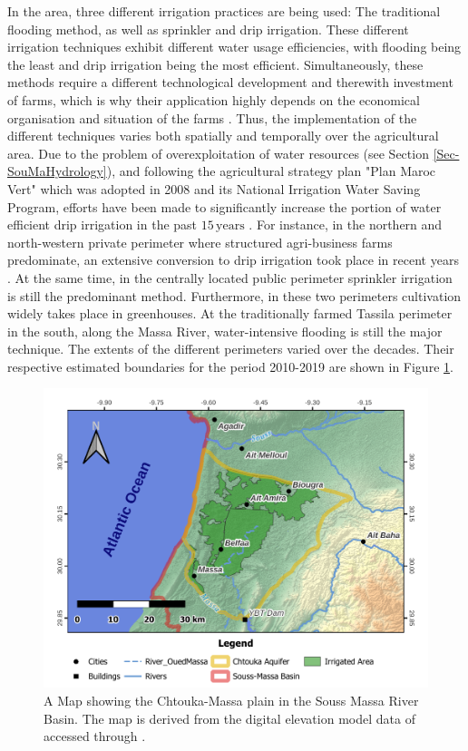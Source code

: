 In the area, three different irrigation practices are being used: The traditional flooding method, as well as sprinkler and drip irrigation. 
These different irrigation techniques exhibit different water usage efficiencies, with flooding being the least and drip irrigation being the most efficient. 
Simultaneously, these methods require a different technological development and therewith investment of farms, which is why their application highly depends on the economical organisation and situation of the farms \parencite{Choukr.2017}. 
Thus, the implementation of the different techniques varies both spatially and temporally over the agricultural area. 
Due to the problem of overexploitation of water resources (see Section \ref{Sec-SouMaHydrology}), and following the agricultural strategy plan "Plan Maroc Vert" which was adopted in 2008 and its National Irrigation Water Saving Program, efforts have been made to significantly increase the portion of water efficient drip irrigation in the past $15 \, \textrm{years}$ \parencite{MarocVert.2021}. 
For instance, in the northern and north-western private perimeter where structured agri-business farms predominate, an extensive conversion to drip irrigation took place in recent years \parencite{ABHSMD.2015}. 
At the same time, in the centrally located public perimeter sprinkler irrigation is still the predominant method. 
Furthermore, in these two perimeters cultivation widely takes place in greenhouses. 
At the traditionally farmed Tassila perimeter in the south, along the Massa River, water-intensive flooding is still the major technique. 
The extents of the different perimeters varied over the decades. Their respective estimated boundaries for the period 2010-2019 are shown in Figure \ref{Map-ChtoukaOverview}.



\begin{figure}[h]
    \centering
    \includegraphics[width=1\textwidth]{./img/Map_ChtoukaOverview.pdf}
    \caption{A Map showing the Chtouka-Massa plain in the Souss Massa River Basin. The map is derived from the digital elevation model data of \cite{NASA.SRTM1Arc} accessed through \cite{USGS.Earthexplorer}.}
    \label{Map-ChtoukaOverview}
\end{figure}